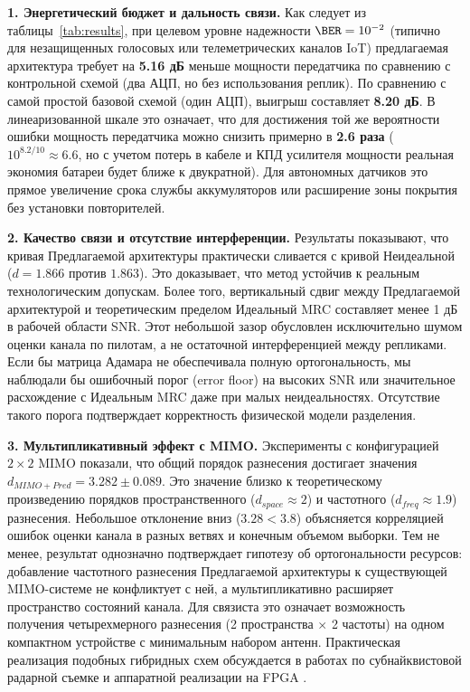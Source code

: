 \documentclass[a4paper,12pt]{article}
\numberwithin{equation}{section}
\begin{document}
\textbf{1. Энергетический бюджет и дальность связи.}
Как следует из таблицы~\ref{tab:results}, при целевом уровне надежности $\BER=10^{-2}$ (типично для незащищенных голосовых или телеметрических каналов IoT) предлагаемая архитектура требует на \textbf{5.16 дБ} меньше мощности передатчика по сравнению с контрольной схемой (два АЦП, но без использования реплик). 
По сравнению с самой простой базовой схемой (один АЦП), выигрыш составляет \textbf{8.20 дБ}. 
В линеаризованной шкале это означает, что для достижения той же вероятности ошибки мощность передатчика можно снизить примерно в \textbf{2.6 раза} ($10^{8.2/10} \approx 6.6$, но с учетом потерь в кабеле и КПД усилителя мощности реальная экономия батареи будет ближе к двукратной). Для автономных датчиков это прямое увеличение срока службы аккумуляторов или расширение зоны покрытия без установки повторителей.

\textbf{2. Качество связи и отсутствие интерференции.}
Результаты показывают, что кривая Предлагаемой архитектуры практически сливается с кривой Неидеальной ($d=1.866$ против $1.863$). Это доказывает, что метод устойчив к реальным технологическим допускам. Более того, вертикальный сдвиг между Предлагаемой архитектурой и теоретическим пределом Идеальный MRC составляет менее 1 дБ в рабочей области SNR. Этот небольшой зазор обусловлен исключительно шумом оценки канала по пилотам, а не остаточной интерференцией между репликами. Если бы матрица Адамара не обеспечивала полную ортогональность, мы наблюдали бы ошибочный порог (error floor) на высоких SNR или значительное расхождение с Идеальным MRC даже при малых неидеальностях. Отсутствие такого порога подтверждает корректность физической модели разделения.

\textbf{3. Мультипликативный эффект с MIMO.}
Эксперименты с конфигурацией $2 \times 2$ MIMO показали, что общий порядок разнесения достигает значения $d_{MIMO+Pred} = 3.282 \pm 0.089$. 
Это значение близко к теоретическому произведению порядков пространственного ($d_{space} \approx 2$) и частотного ($d_{freq} \approx 1.9$) разнесения. 
Небольшое отклонение вниз ($3.28 < 3.8$) объясняется корреляцией ошибок оценки канала в разных ветвях и конечным объемом выборки. Тем не менее, результат однозначно подтверждает гипотезу об ортогональности ресурсов: добавление частотного разнесения Предлагаемой архитектуры к существующей MIMO-системе не конфликтует с ней, а мультипликативно расширяет пространство состояний канала. Для связиста это означает возможность получения четырехмерного разнесения (2 пространства $\times$ 2 частоты) на одном компактном устройстве с минимальным набором антенн. Практическая реализация подобных гибридных схем обсуждается в работах по субнайквистовой радарной съемке и аппаратной реализации на FPGA \cite{han,gadawe}.
\end{document}

